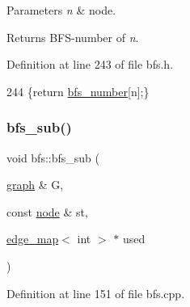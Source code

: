 \begin{DoxyParams}{Parameters}
{\em n} & node. \\
\hline
\end{DoxyParams}
\begin{DoxyReturn}{Returns}
B\+F\+S-\/number of {\itshape n}. 
\end{DoxyReturn}


Definition at line 243 of file bfs.\+h.


\begin{DoxyCode}
244     \{\textcolor{keywordflow}{return} \mbox{\hyperlink{classbfs_a59d0c5c5ad2715776b20b1aec03dbc3a}{bfs\_number}}[n];\}
\end{DoxyCode}
\mbox{\label{classbfs_a567815d3b63e802420f4b536749a1ad2}} 
\subsubsection{\texorpdfstring{bfs\+\_\+sub()}{bfs\_sub()}}
{\footnotesize\ttfamily void bfs\+::bfs\+\_\+sub (\begin{DoxyParamCaption}\item[{\mbox{\hyperlink{classgraph}{graph}} \&}]{G,  }\item[{const \mbox{\hyperlink{classnode}{node}} \&}]{st,  }\item[{\mbox{\hyperlink{classedge__map}{edge\+\_\+map}}$<$ int $>$ $\ast$}]{used }\end{DoxyParamCaption})\hspace{0.3cm}{\ttfamily [private]}}



Definition at line 151 of file bfs.\+cpp.


